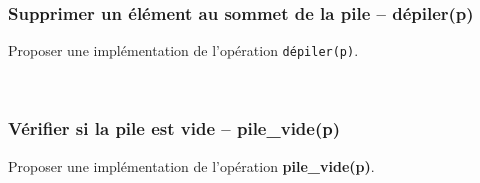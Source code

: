 \documentclass[10pt,fleqn]{article} %
\begin{document}
\subsubsection*{Supprimer un élément au sommet de la pile -- \textbf{dépiler(p)}}
Proposer une implémentation de l'opération \texttt{dépiler(p)}.

\begin{py} ~\\
\vspace{3cm}
\end{py}

\subsubsection*{Vérifier si la pile est vide -- \textbf{pile\_vide(p)}}
Proposer une implémentation de l'opération \textbf{pile\_vide(p)}.


\begin{py}~\\
\vspace{3cm}
\end{py}
\end{document}
